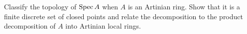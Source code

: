 \begin{problem}\label{chal:vi18-c03}
Classify the topology of $\operatorname{Spec} A$ when $A$ is an Artinian ring.  Show that it is a finite discrete set of closed points and relate the decomposition to the product decomposition of $A$ into Artinian local rings.
\end{problem}
